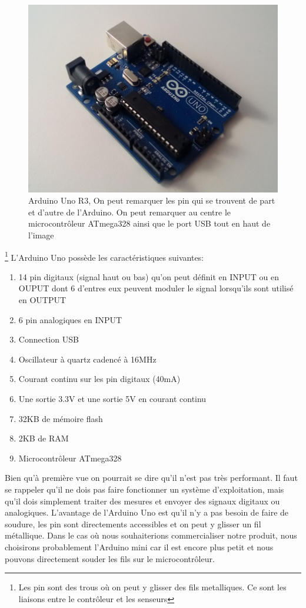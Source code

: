 \documentclass[a4paper,12pt]{report}
\begin{document}
{\begin{figure}[h]
\begin{center}
\includegraphics[scale=0.38]{arduino_uno.jpg}
\caption{Arduino Uno R3\label{fig:ArduinoUnoR3}, On peut remarquer les pin  \label{pin} qui se trouvent de part et d'autre de l'Arduino. On peut remarquer au centre le microcontrôleur ATmega328 ainsi que le port USB tout en haut de l'image}
\end{center}
\end{figure}\footnote{Les pin sont des trous où on peut y glisser des fils metalliques. Ce sont les liaisons entre le contrôleur et les senseurs}
L'Arduino Uno possède les caractéristiques suivantes:
\begin{enumerate}
\item 14 pin digitaux (signal haut ou bas) qu'on peut définit en INPUT ou en OUPUT dont 6 d'entres eux peuvent moduler le signal lorsqu'ils sont utilisé en OUTPUT
\item  6 pin analogiques  en INPUT
\item Connection USB
\item Oscillateur à quartz cadencé à 16MHz
\item Courant continu sur les pin digitaux (40mA)
\item Une sortie 3.3V et une sortie 5V en courant continu
\item 32KB de mémoire flash
\item 2KB de RAM
\item Microcontrôleur ATmega328
\end{enumerate}
Bien qu'à première vue on pourrait se dire qu'il n'est pas très performant. Il faut se rappeler qu'il ne dois pas faire fonctionner un système d'exploitation, mais qu'il dois simplement traiter des mesures et envoyer des signaux digitaux ou analogiques. L'avantage de l'Arduino Uno est qu'il n'y a pas besoin de faire de soudure, les pin sont directements accessibles et on peut y glisser un fil métallique. Dans le cas où nous souhaiterions commercialiser notre produit, nous choisirons probablement l'Arduino mini car il est encore plus petit et nous pouvons directement souder les fils sur le microcontrôleur.

}
\end{document}
